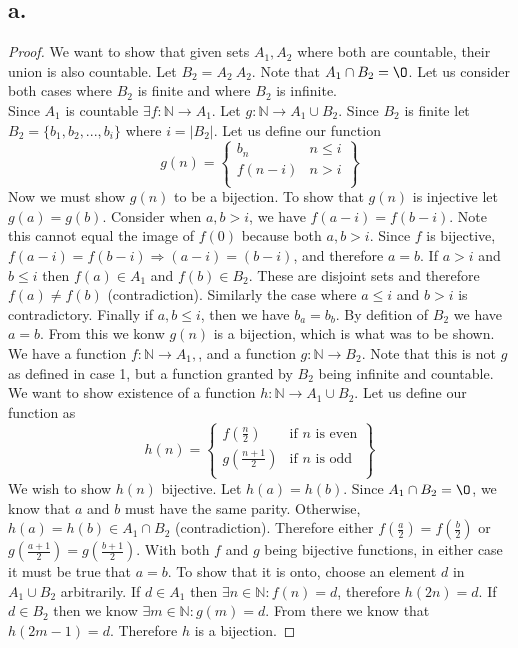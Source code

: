 \documentclass{article}
\begin{document}
\subsection*{a.}
\begin{proof}
We want to show that given sets $A_1, A_2$ where both are countable, their union is also countable. Let $B_2 = A_2 \ A_2$. Note that $A_1 \cap B_2 = \O$. Let us consider both cases where $B_2$ is finite and where $B_2$ is infinite. \\

Since $A_1$ is countable $\exists f : \mathbb{N} \rightarrow A_1$. Let $g : \mathbb{N} \rightarrow A_1 \cup B_2$. Since $B_2$ is finite let $B_2 = \{b_1, b_2, ... ,b_i\}$ where $i = |B_2|$. Let us define our function
\[
    g(n) = \left\{\begin{array}{lr}
        b_n & n \leqslant i\\
        f(n-i) & n > i\\
        \end{array}\right\}
\]
Now we must show $g(n)$ to be a bijection. To show that $g(n)$ is injective let $g(a) = g(b)$. Consider when $a,b > i$, we have $f(a-i) = f(b-i)$. Note this cannot equal the image of $f(0)$ because both $a,b > i$. Since $f$ is bijective, $f(a-i)=f(b-i) \Longrightarrow (a-i)=(b-i)$, and therefore $a = b$. If $a > i$ and $b \leqslant i$ then $f(a) \in A_1$ and $f(b) \in B_2$. These are disjoint sets and therefore $f(a) \neq f(b)$ (contradiction). Similarly the case where $a \leqslant i$ and $b > i$ is contradictory. Finally if $a,b \leqslant i$, then we have $b_a = b_b$. By defition of $B_2$ we have $a = b$. From this we konw $g(n)$ is a bijection, which is what was to be shown.\\


We have a function $f:\mathbb{N} \rightarrow A_1,$, and a function $g: \mathbb{N} \rightarrow B_2$. Note that this is not $g$ as defined in case 1, but a function granted by $B_2$ being infinite and countable. We want to show existence of a function $h: \mathbb{N} \rightarrow A_1 \cup B_2$. Let us define our function as
\[
    h(n) = \left\{\begin{array}{lr}
        f(\frac{n}{2}) & \text{if } n \text{ is even}\\
        g(\frac{n+1}{2}) & \text{if } n \text{ is odd}\\
        \end{array}\right\}
\]
We wish to show $h(n)$ bijective. Let $h(a) = h(b)$. Since $A_1 \cap B_2 = \O$, we know that $a$ and $b$ must have the same parity. Otherwise, $h(a) = h(b) \in A_1 \cap B_2$ (contradiction). Therefore either $f(\frac{a}{2}) = f(\frac{b}{2})$ or $g(\frac{a+1}{2}) = g(\frac{b+1}{2})$. With both $f$ and $g$ being bijective functions, in either case it must be true that $a = b$. To show that it is onto, choose an element $d$ in $A_1 \cup B_2$ arbitrarily. If $d \in A_1$ then $\exists n \in \mathbb{N} : f(n) = d$, therefore $h(2n) = d$. If $d \in B_2$ then we know $\exists m \in \mathbb{N} : g(m) = d$. From there we know that $h(2m-1) = d$. Therefore $h$ is a bijection.

\end{proof}
\end{document}
